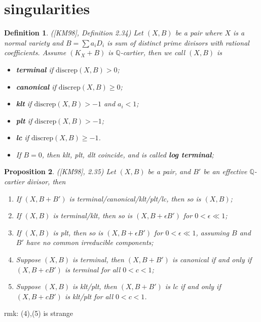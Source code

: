 \documentclass{article}
\newtheorem{defn}{Definition}[section]
\newtheorem{prop}[defn]{Proposition}
\begin{document}
\section{singularities}

\begin{defn}
	([KM98], Definition 2.34) Let $ (X,B) $ be a pair where $ X $ is a normal variety and $ B=\sum a_iD_i $ is sum of distinct prime divisors with rational coefficients. Assume $ (K_X+B) $ is $ \mathbb{Q} $-cartier, then we call $ (X,B) $ is 
	\begin{itemize}
		\item \textbf{terminal} if $ \mathrm{discrep}(X,B) >0$;
		\item \textbf{canonical} if $ \mathrm{discrep}(X,B) \geqslant 0$;
		\item \textbf{klt} if $ \mathrm{discrep}(X,B) >-1$ and $ a_i<1 $;
		\item \textbf{plt} if $ \mathrm{discrep}(X,B) >-1$;
		\item \textbf{lc} if $ \mathrm{discrep}(X,B) \geqslant -1 $. 
		\item If $ B=0 $, then klt, plt, dlt coincide, and is called \textbf{log terminal};
	\end{itemize}
\end{defn}

\begin{prop}
	([KM98], 2.35) Let $ (X,B) $ be a pair, and $ B' $ be  an effective $ \mathbb{Q} $-cartier divisor, then
	\begin{enumerate}
		\item If $ (X, B+B') $ is terminal/canonical/klt/plt/lc, then so is $ (X,B) $;
		\item If $ (X,B) $ is terminal/klt, then so is $ (X,B+\epsilon B') $ for $ 0<\epsilon\ll 1 $;
		\item If $ (X,B) $ is plt, then so is $ (X,B+\epsilon B') $ for $ 0<\epsilon\ll 1 $, assuming $ B $ and $ B' $ have no common irreducible components;
		\item Suppose $ (X,B) $ is terminal, then $ (X,B+B') $ is canonical if and only if $ (X,B+cB') $ is terminal for all $ 0<c<1 $;
		\item Suppose $ (X,B) $ is klt/plt, then $ (X,B+B') $ is lc if and only if $ (X,B+cB') $ is klt/plt for all $ 0<c<1 $.
	\end{enumerate}
\end{prop}
	rmk: (4),(5) is strange
	
\end{document}
